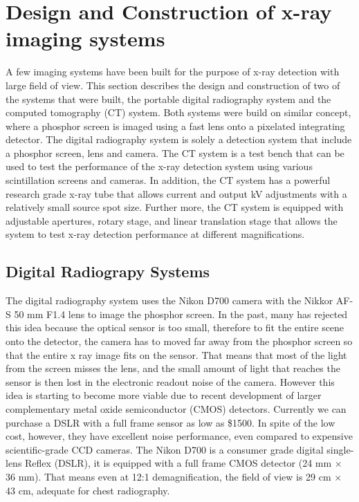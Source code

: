 \chapter{Design and Construction of x-ray imaging systems}
A few imaging systems have been built for the purpose of x-ray detection with large field of view.  This section describes the design and construction of two of the systems that were built, the portable digital radiography system and the computed tomography (CT) system.  Both systems were build on similar concept, where a phosphor screen is imaged using a fast lens onto a pixelated integrating detector.  The digital radiography system is solely a detection system that include a phosphor screen, lens and camera.  The CT system is a test bench that can be used to test the performance of the x-ray detection system using various scintillation screens and cameras.  In addition, the CT system has a powerful research grade x-ray tube that allows current and output kV adjustments with a relatively small source spot size.  Further more, the CT system is equipped with adjustable apertures, rotary stage, and linear translation stage that allows the system to test x-ray detection performance at different magnifications.

\section{Digital Radiograpy Systems}
The digital radiography system uses the Nikon D700 camera with the Nikkor AF-S 50 mm F1.4 lens to image the phosphor screen.  In the past, many has rejected this idea because the optical sensor is too small, therefore to fit the entire scene onto the detector, the camera has to moved far away from the phosphor screen so that the entire x ray image fits on the sensor.  That means that most of the light from the screen misses the lens, and the small amount of light that reaches the sensor is then lost in the electronic readout noise of the camera.   However this idea is starting to become more viable due to recent development of larger complementary metal oxide semiconductor (CMOS) detectors.  Currently we can purchase a DSLR with a full frame sensor as low as \$1500.  In spite of the low cost, however, they have excellent noise performance, even compared to expensive scientific-grade CCD cameras.  The Nikon D700 is a consumer grade digital single-lens Reflex (DSLR), it is equipped with a full frame CMOS detector (24 mm $\times$ 36 mm).  That means even at 12:1 demagnification, the field of view is 29 cm $\times$ 43 cm, adequate for chest radiography.  

